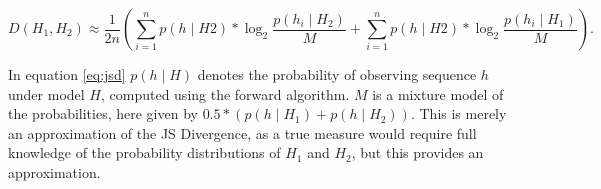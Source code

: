 \begin{equation}
D(H_1, H_2) \approx \frac{1}{2n} \left(
    \sum_{i=1}^n p(h \mid H2)*\log_2 \frac{p(h_i \mid H_2)}{M}
    + \sum_{i=1}^n p(h \mid H2)*\log_2 \frac{p(h_i \mid H_1)}{M}
\right).
\label{eq:jsd}
\end{equation}


In equation \ref{eq:jsd} $p(h \mid H)$ denotes the probability of observing sequence $h$ under model $H$, computed
using the forward algorithm. $M$ is a mixture model of the probabilities, here 
given by $0.5*(p(h \mid H_1) + p(h \mid H_2))$. This is merely an approximation of the JS Divergence, as
a true measure would require full knowledge of the probability distributions of $H_1$ and $H_2$, but this 
provides an approximation. 


